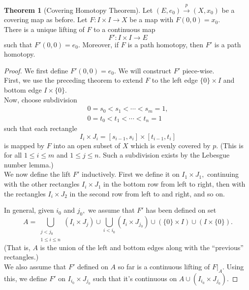 \documentclass[12pt]{article}
\theoremstyle{definition}
\newtheorem{thm}{Theorem}
\numberwithin{thm}{section}
\begin{document}
\begin{thm}[Covering Homotopy Theorem]
	Let $(E, e_0) \overset{p}{\longrightarrow} (X, x_0)$ be a covering map as before. Let $F:I \times I \to X$ be a map with $F(0, 0) = x_0.$\\
	There is a unique lifting of $F$ to a continuous map
	\begin{equation*} 
		F':I \times I \to E
	\end{equation*}
	such that $F'(0, 0) = e_0.$ Moreover, if $F$ is a path homotopy, then $F'$ is a path homotopy.
\end{thm} 
\begin{proof} 
	We first define $F'(0, 0) = e_0.$ We will construct $F'$ piece-wise.\\
	First, we use the preceding theorem to extend $F$ to the left edge $\{0\} \times I$ and bottom edge $I \times \{0\}.$ \\
	Now, choose subdivision
	\begin{align*} 
		0 = s_0 < s_1 < \cdots < s_m = 1,\\
		0 = t_0 < t_1 < \cdots < t_n = 1
	\end{align*}
	such that each rectangle 
	\begin{equation*} 
		I_i \times J_i = [s_{i - 1}, s_i] \times [t_{i - 1}, t_i] 
	\end{equation*}
	is mapped by $F$ into an open subset of $X$ which is evenly covered by $p.$ (This is for all $1 \le i \le m$ and $1 \le j \le n.$ Such a subdivision exists by the Lebesgue number lemma.)\\
	We now define the lift $F'$ inductively. First we define it on $I_1 \times J_1,$ continuing with the other rectangles $I_i \times J_1$ in the bottom row from left to right, then with the rectangles $I_i \times J_2$ in the second row from left to and right, and so on.

	In general, given $i_0$ and $j_0,$ we assume that $F'$ has been defined on set
	\begin{equation*} 
		A = \bigcup_{\substack{j < j_0\\1 \le i \le n}}(I_i \times J_j) \cup \bigcup_{i < i_0}(I_i \times J_{j_0}) \cup \left(\{0\} \times I\right) \cup \left(I \times \{0\}\right).
	\end{equation*}
	(That is, $A$ is the union of the left and bottom edges along with the ``previous'' rectangles.)\\
	We also assume that $F'$ defined on $A$ so far is a continuous lifting of $F|_A.$ Using this, we define $F'$ on $I_{i_0} \times J_{j_0}$ such that it's continuous on $A \cup (I_{i_0} \times J_{j_0}).$


\end{proof}
\end{document}
